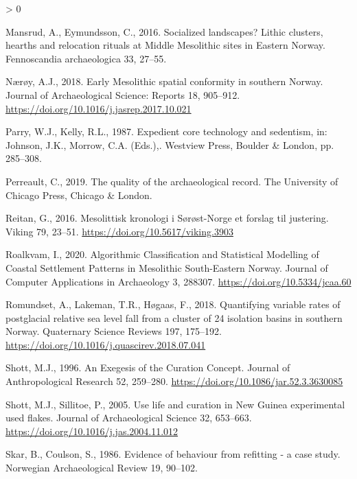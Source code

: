 \documentclass[
]{article}
\newlength{\cslhangindent}
\newenvironment{CSLReferences}[2] %
 {%
  \setlength{\parindent}{0pt}
  \ifodd #1 \everypar{\setlength{\hangindent}{\cslhangindent}}\ignorespaces\fi
  \ifnum #2 > 0
  \setlength{\parskip}{#2\baselineskip}
  \fi
 }%
 {}
\begin{document}
\begin{CSLReferences}{1}{0}
\leavevmode\hypertarget{ref-mansrud2016}{}%
Mansrud, A., Eymundsson, C., 2016. Socialized landscapes? Lithic clusters, hearths and relocation rituals at Middle Mesolithic sites in Eastern Norway. Fennoscandia archaeologica 33, 27--55.

\leavevmode\hypertarget{ref-nuxe6ruxf8y2018}{}%
Nærøy, A.J., 2018. Early Mesolithic spatial conformity in southern Norway. Journal of Archaeological Science: Reports 18, 905--912. \url{https://doi.org/10.1016/j.jasrep.2017.10.021}

\leavevmode\hypertarget{ref-parry1987}{}%
Parry, W.J., Kelly, R.L., 1987. Expedient core technology and sedentism, in: Johnson, J.K., Morrow, C.A. (Eds.),. Westview Press, Boulder \& London, pp. 285--308.

\leavevmode\hypertarget{ref-perreault2019}{}%
Perreault, C., 2019. The quality of the archaeological record. The University of Chicago Press, Chicago \& London.

\leavevmode\hypertarget{ref-reitan2016}{}%
Reitan, G., 2016. Mesolittisk kronologi i Sørøst-Norge {{}} et forslag til justering. Viking 79, 23--51. \url{https://doi.org/10.5617/viking.3903}

\leavevmode\hypertarget{ref-roalkvam2020}{}%
Roalkvam, I., 2020. Algorithmic Classification and Statistical Modelling of Coastal Settlement Patterns in Mesolithic South-Eastern Norway. Journal of Computer Applications in Archaeology 3, 288307. \url{https://doi.org/10.5334/jcaa.60}

\leavevmode\hypertarget{ref-romundset2018}{}%
Romundset, A., Lakeman, T.R., Høgaas, F., 2018. Quantifying variable rates of postglacial relative sea level fall from a cluster of 24 isolation basins in southern Norway. Quaternary Science Reviews 197, 175--192. \url{https://doi.org/10.1016/j.quascirev.2018.07.041}

\leavevmode\hypertarget{ref-shott1996}{}%
Shott, M.J., 1996. An Exegesis of the Curation Concept. Journal of Anthropological Research 52, 259--280. \url{https://doi.org/10.1086/jar.52.3.3630085}

\leavevmode\hypertarget{ref-shott2005}{}%
Shott, M.J., Sillitoe, P., 2005. Use life and curation in New Guinea experimental used flakes. Journal of Archaeological Science 32, 653--663. \url{https://doi.org/10.1016/j.jas.2004.11.012}

\leavevmode\hypertarget{ref-skar1986}{}%
Skar, B., Coulson, S., 1986. Evidence of behaviour from refitting - a case study. Norwegian Archaeological Review 19, 90--102.


\end{CSLReferences}
\end{document}
